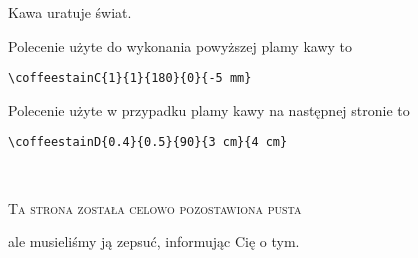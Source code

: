 \documentclass[a4paper, 11pt, BCOR = 0 pt, DIV = 11, oneside]{scrartcl}
\begin{document}
\noindent
Kawa uratuje świat.

\vfill{}

\begin{tcolorbox}
Polecenie użyte do wykonania powyższej plamy kawy to

  \verb|\coffeestainC{1}{1}{180}{0}{-5 mm}|
\end{tcolorbox}

\begin{tcolorbox}
Polecenie użyte w przypadku plamy kawy na następnej stronie to

  \verb|\coffeestainD{0.4}{0.5}{90}{3 cm}{4 cm}|
\end{tcolorbox}

\newpage{}
\pagestyle{empty}
~\\

\label{stainD}

\vfill{}
\begin{center}
\textsc{Ta strona została celowo pozostawiona pusta}

ale musieliśmy ją zepsuć, informując Cię o tym.
\end{center}

\vfill{}
\end{document}
